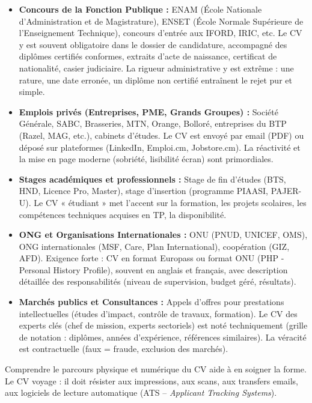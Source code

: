 \documentclass[11pt]{article}
\newcommand{\cle}[1]{{\popxbold\color{popdark}#1}}
\newcounter{popsec}
\newcounter{popsub}
\newcommand{\courssub}[1]{%
  \stepcounter{popsub}%
  \par\vspace{9pt}\noindent{\popxbold\fontsize{11.5}{13}\selectfont\color{popink}{\color{poporange}\thepopsec.\thepopsub}\hspace{6pt}#1}\par\nopagebreak\vspace{4pt}
}
\begin{document}
\begin{exemplebox}
\begin{itemize}
    \item \textbf{Concours de la Fonction Publique :} ENAM (École Nationale d'Administration et de Magistrature), ENSET (École Normale Supérieure de l'Enseignement Technique), concours d'entrée aux IFORD, IRIC, etc. Le CV y est souvent obligatoire dans le dossier de candidature, accompagné des \cle{diplômes certifiés conformes}, extraits d'acte de naissance, certificat de nationalité, casier judiciaire. La rigueur administrative y est extrême : une rature, une date erronée, un diplôme non certifié entraînent le rejet pur et simple.
    \item \textbf{Emplois privés (Entreprises, PME, Grands Groupes) :} Société Générale, SABC, Brasseries, MTN, Orange, Bolloré, entreprises du BTP (Razel, MAG, etc.), cabinets d'études. Le CV est envoyé par email (PDF) ou déposé sur plateformes (LinkedIn, Emploi.cm, Jobstore.cm). La réactivité et la mise en page moderne (sobriété, lisibilité écran) sont primordiales.
    \item \textbf{Stages académiques et professionnels :} Stage de fin d'études (BTS, HND, Licence Pro, Master), stage d'insertion (programme PIAASI, PAJER-U). Le CV « étudiant » met l'accent sur la formation, les projets scolaires, les compétences techniques acquises en TP, la disponibilité.
    \item \textbf{ONG et Organisations Internationales :} ONU (PNUD, UNICEF, OMS), ONG internationales (MSF, Care, Plan International), coopération (GIZ, AFD). Exigence forte : CV en \cle{format Europass} ou format ONU (PHP - Personal History Profile), souvent en \cle{anglais} et français, avec description détaillée des responsabilités (niveau de supervision, budget géré, résultats).
    \item \textbf{Marchés publics et Consultances :} Appels d'offres pour prestations intellectuelles (études d'impact, contrôle de travaux, formation). Le CV des experts clés (chef de mission, experts sectoriels) est noté techniquement (grille de notation : diplômes, années d'expérience, références similaires). La \cle{véracité} est contractuelle (faux = fraude, exclusion des marchés).
\end{itemize}
\end{exemplebox}

\courssub{Le circuit du CV : du candidat au recruteur}

Comprendre le parcours physique et numérique du CV aide à en soigner la forme. Le CV voyage : il doit résister aux impressions, aux scans, aux transfers emails, aux logiciels de lecture automatique (ATS -- \emph{Applicant Tracking Systems}).
\end{document}
